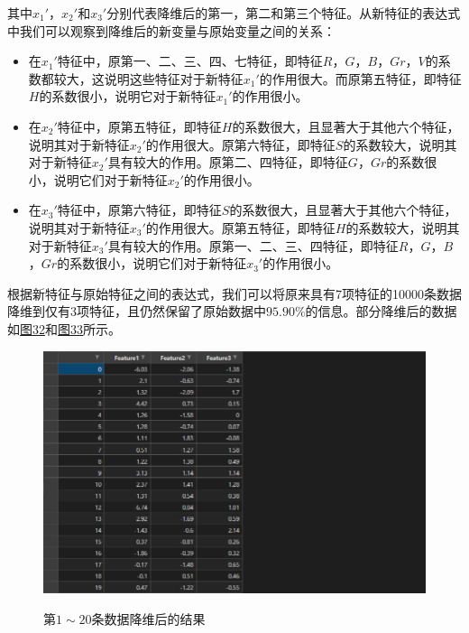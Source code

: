 \documentclass[UTF8]{ctexart}
\begin{document}
	其中$x_1'$，$x_2'$和$x_3'$分别代表降维后的第一，第二和第三个特征。从新特征的表达式中我们可以观察到降维后的新变量与原始变量之间的关系：
	\begin{itemize}
		\item 在$x_1'$特征中，原第一、二、三、四、七特征，即特征$R$，$G$，$B$，$Gr$，$V$的系数都较大，这说明这些特征对于新特征$x_1'$的作用很大。而原第五特征，即特征$H$的系数很小，说明它对于新特征$x_1'$的作用很小。
		\item 在$x_2'$特征中，原第五特征，即特征$H$的系数很大，且显著大于其他六个特征，说明其对于新特征$x_2'$的作用很大。原第六特征，即特征$S$的系数较大，说明其对于新特征$x_2'$具有较大的作用。原第二、四特征，即特征$G$，$Gr$的系数很小，说明它们对于新特征$x_2'$的作用很小。
		\item 在$x_3'$特征中，原第六特征，即特征$S$的系数很大，且显著大于其他六个特征，说明其对于新特征$x_3'$的作用很大。原第五特征，即特征$H$的系数较大，说明其对于新特征$x_3'$具有较大的作用。原第一、二、三、四特征，即特征$R$，$G$，$B$，$Gr$的系数很小，说明它们对于新特征$x_3'$的作用很小。
	\end{itemize} 
	
	根据新特征与原始特征之间的表达式，我们可以将原来具有7项特征的10000条数据降维到仅有3项特征，且仍然保留了原始数据中$95.90\%$的信息。部分降维后的数据如\hyperref[Fig.32]{图32}和\hyperref[Fig.33]{图33}所示。
	
	\begin{figure}[htbp]
		\centering
		\caption{第$1\sim20$条数据降维后的结果}
		\includegraphics[width=1.0\textwidth]{data_pca1.png}
		\label{Fig.32}
	\end{figure}
	
\end{document}

